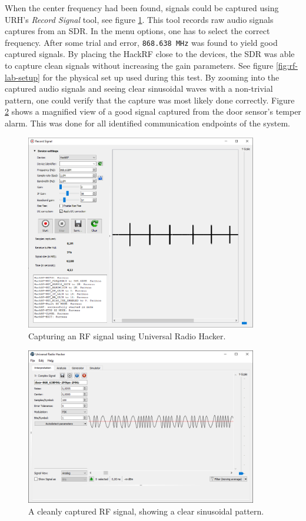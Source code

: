 When the center frequency had been found, signals could be captured using URH's \textit{Record Signal} tool, see figure \ref{fig:rf-signal-capture}. This tool records raw audio signals captures from an SDR. In the menu options, one has to select the correct frequency. After some trial and error, \texttt{868.638 MHz} was found to yield good captured signals. By placing the HackRF close to the devices, the SDR was able to capture clean signals without increasing the gain parameters. See figure \ref{fig:rf-lab-setup} for the physical set up used during this test. By zooming into the captured audio signals and seeing clear sinusoidal waves with a non-trivial pattern, one could verify that the capture was most likely done correctly. Figure \ref{fig:zoomed-in-signal} shows a magnified view of a good signal captured from the door sensor's temper alarm. This was done for all identified communication endpoints of the system.
\begin{figure}[!ht]
    \centering
    \includegraphics[width=0.9\textwidth]{images/6-pentesting/signal-capture.png}
    \caption{Capturing an RF signal using Universal Radio Hacker.}
    \label{fig:rf-signal-capture}
\end{figure}
\begin{figure}[!ht]
    \centering
    \includegraphics[width=0.9\textwidth]{images/6-pentesting/zoomed-in-signal.png}
    \caption{A cleanly captured RF signal, showing a clear sinusoidal pattern.}
    \label{fig:zoomed-in-signal}
\end{figure}


